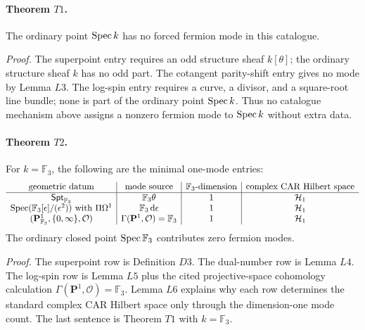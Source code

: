\paragraph{Theorem \(T1\).}
The ordinary point \(\operatorname{Spec} k\) has no forced fermion mode in this catalogue.

\emph{Proof.}
The superpoint entry requires an odd structure sheaf \(k[\theta]\); the
ordinary structure sheaf \(k\) has no odd part.  The cotangent parity-shift
entry gives no mode by Lemma \(L3\).  The log-spin entry requires a curve,
a divisor, and a square-root line bundle; none is part of the ordinary point
\(\operatorname{Spec} k\).  Thus no catalogue mechanism above assigns a nonzero fermion
mode to \(\operatorname{Spec} k\) without extra data.

\paragraph{Theorem \(T2\).}
For \(k=\mathbb F_3\), the following are the minimal one-mode entries:
\[
\begin{array}{c|c|c|c}
\text{geometric datum}&\text{mode source}&\mathbb F_3\text{-dimension}
&\text{complex CAR Hilbert space}\\
\hline
\mathsf{Spt}_{\mathbb F_3}&\mathbb F_3\theta&1&\mathcal H_1\\
\operatorname{Spec}(\mathbb F_3[\epsilon]/(\epsilon^2))\text{ with }\Pi\Omega^1
&\mathbb F_3\,\mathrm d\epsilon&1&\mathcal H_1\\
(\mathbf P^1_{\mathbb F_3},\{0,\infty\},\mathcal O)&
\Gamma(\mathbf P^1,\mathcal O)=\mathbb F_3&1&\mathcal H_1
\end{array}
\]
The ordinary closed point \(\operatorname{Spec}\mathbb F_3\) contributes zero fermion modes.

\emph{Proof.}
The superpoint row is Definition \(D3\).  The dual-number row is Lemma \(L4\).
The log-spin row is Lemma \(L5\) plus the cited projective-space cohomology
calculation \(\Gamma(\mathbf P^1,\mathcal O)=\mathbb F_3\).  Lemma \(L6\)
explains why each row determines the standard complex CAR Hilbert space only
through the dimension-one mode count.  The last sentence is Theorem \(T1\)
with \(k=\mathbb F_3\).
